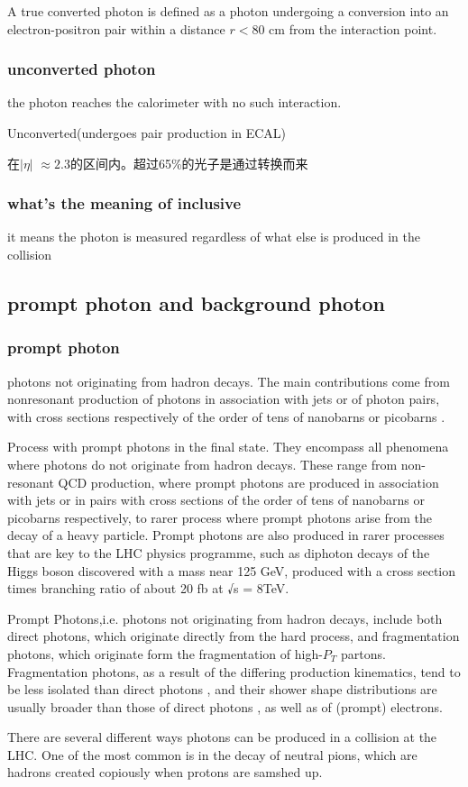 \documentclass{ctexart}
\begin{document}
A true converted photon is defined as a photon undergoing a conversion into an electron-positron pair within a distance $r < 80  $ cm from the interaction point. 

\subsubsection{unconverted photon}
the photon reaches the calorimeter with  no such interaction.\par
Unconverted(undergoes pair production in ECAL)\par
在$|\eta|$ $\approx2.3$的区间内。超过65\%的光子是通过转换而来
\subsubsection{\textbf{\large what's the meaning of inclusive}}
it means the photon is measured regardless of what else is  produced in the collision
\subsection{prompt photon and background photon}
\subsubsection{prompt photon}
photons not originating from hadron decays. The main contributions come from nonresonant
production of photons in association with jets or
of photon pairs, with cross sections respectively of the order
of tens of nanobarns or picobarns .\par
\medskip
Process with prompt photons in the final state. They encompass all phenomena where photons do not originate from hadron decays. These range from non-resonant QCD production, where prompt photons are produced in association with jets or in pairs with cross sections of the order of tens of nanobarns or picobarns respectively, to rarer process where prompt photons arise from the decay of a heavy particle.  
Prompt photons are also produced in rarer processes that are key
to the LHC physics programme, such as diphoton decays
of the Higgs boson discovered with a mass near 125 GeV,
produced with a cross section times branching ratio of about
20 fb at √s = 8TeV.\par
\medskip
Prompt Photons,i.e.  photons not originating from hadron decays, include both direct photons, which originate directly from the hard process, and fragmentation photons, which originate form the fragmentation of high-$P_T$ partons. Fragmentation photons, as a result of the differing production kinematics, tend to be less isolated than direct photons , and their shower shape distributions are usually broader than those of direct photons , as well as of (prompt) electrons.\par
\medskip
There are several different ways photons can be produced in a collision at the LHC. One of the most common is in the decay of neutral pions, which are hadrons created copiously when protons are samshed up.
\end{document}

